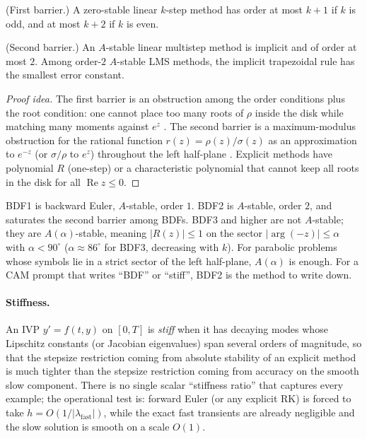 \documentclass[11pt,a4paper]{article}
\begin{document}
\begin{theorem}
\label{thm:dahlquist-barriers}
(First barrier.) A zero-stable linear \(k\)-step method has order at most \(k+1\) if \(k\) is odd, and at most \(k+2\) if \(k\) is even.

(Second barrier.) An \(A\)-stable linear multistep method is implicit and of order at most \(2\). Among order-\(2\) \(A\)-stable LMS methods, the implicit trapezoidal rule has the smallest error constant.
\end{theorem}

\begin{proof}[Proof idea]
The first barrier is an obstruction among the order conditions plus the root condition: one cannot place too many roots of \(\rho\) inside the disk while matching many moments against \(e^{z}\) \cite[Ch.~III]{hairer93}. The second barrier is a maximum-modulus obstruction for the rational function \(r(z)=\rho(z)/\sigma(z)\) as an approximation to \(e^{-z}\) (or \(\sigma/\rho\) to \(e^{z}\)) throughout the left half-plane \cite{hairer96}. Explicit methods have polynomial \(R\) (one-step) or a characteristic polynomial that cannot keep all roots in the disk for all \(\operatorname{Re}z\le 0\).
\end{proof}

\begin{remark}
\label{rem:bdf-aalpha}
BDF1 is backward Euler, \(A\)-stable, order \(1\). BDF2 is \(A\)-stable, order \(2\), and saturates the second barrier among BDFs. BDF3 and higher are not \(A\)-stable; they are \(A(\alpha)\)-stable, meaning \(\lvert R(z)\rvert\le 1\) on the sector \(\lvert\arg(-z)\rvert\le\alpha\) with \(\alpha<90^{\circ}\) (\(\alpha\approx 86^{\circ}\) for BDF3, decreasing with \(k\)). For parabolic problems whose symbols lie in a strict sector of the left half-plane, \(A(\alpha)\) is enough. For a CAM prompt that writes ``BDF'' or ``stiff'', BDF2 is the method to write down.
\end{remark}

\paragraph{Stiffness.}

\begin{definition}
\label{def:stiff}
An IVP \(y'=f(t,y)\) on \([0,T]\) is \emph{stiff} when it has decaying modes whose Lipschitz constants (or Jacobian eigenvalues) span several orders of magnitude, so that the stepsize restriction coming from absolute stability of an explicit method is much tighter than the stepsize restriction coming from accuracy on the smooth slow component. There is no single scalar ``stiffness ratio'' that captures every example; the operational test is: forward Euler (or any explicit RK) is forced to take \(h=O(1/\lvert\lambda_{\mathrm{fast}}\rvert)\), while the exact fast transients are already negligible and the slow solution is smooth on a scale \(O(1)\).
\end{definition}
\end{document}
